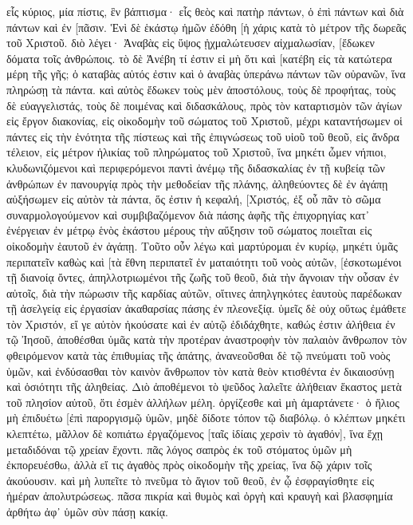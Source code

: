 εἷς κύριος, μία πίστις, ἓν βάπτισμα· 
εἷς θεὸς καὶ πατὴρ πάντων, ὁ ἐπὶ πάντων καὶ διὰ πάντων καὶ ἐν [πᾶσιν. 
Ἑνὶ δὲ ἑκάστῳ ἡμῶν ἐδόθη [ἡ χάρις κατὰ τὸ μέτρον τῆς δωρεᾶς τοῦ Χριστοῦ. 
διὸ λέγει· Ἀναβὰς εἰς ὕψος ᾐχμαλώτευσεν αἰχμαλωσίαν, [ἔδωκεν δόματα τοῖς ἀνθρώποις. 
τὸ δὲ Ἀνέβη τί ἐστιν εἰ μὴ ὅτι καὶ [κατέβη εἰς τὰ κατώτερα μέρη τῆς γῆς; 
ὁ καταβὰς αὐτός ἐστιν καὶ ὁ ἀναβὰς ὑπεράνω πάντων τῶν οὐρανῶν, ἵνα πληρώσῃ τὰ πάντα. 
καὶ αὐτὸς ἔδωκεν τοὺς μὲν ἀποστόλους, τοὺς δὲ προφήτας, τοὺς δὲ εὐαγγελιστάς, τοὺς δὲ ποιμένας καὶ διδασκάλους, 
πρὸς τὸν καταρτισμὸν τῶν ἁγίων εἰς ἔργον διακονίας, εἰς οἰκοδομὴν τοῦ σώματος τοῦ Χριστοῦ, 
μέχρι καταντήσωμεν οἱ πάντες εἰς τὴν ἑνότητα τῆς πίστεως καὶ τῆς ἐπιγνώσεως τοῦ υἱοῦ τοῦ θεοῦ, εἰς ἄνδρα τέλειον, εἰς μέτρον ἡλικίας τοῦ πληρώματος τοῦ Χριστοῦ, 
ἵνα μηκέτι ὦμεν νήπιοι, κλυδωνιζόμενοι καὶ περιφερόμενοι παντὶ ἀνέμῳ τῆς διδασκαλίας ἐν τῇ κυβείᾳ τῶν ἀνθρώπων ἐν πανουργίᾳ πρὸς τὴν μεθοδείαν τῆς πλάνης, 
ἀληθεύοντες δὲ ἐν ἀγάπῃ αὐξήσωμεν εἰς αὐτὸν τὰ πάντα, ὅς ἐστιν ἡ κεφαλή, [Χριστός, 
ἐξ οὗ πᾶν τὸ σῶμα συναρμολογούμενον καὶ συμβιβαζόμενον διὰ πάσης ἁφῆς τῆς ἐπιχορηγίας κατ᾽ ἐνέργειαν ἐν μέτρῳ ἑνὸς ἑκάστου μέρους τὴν αὔξησιν τοῦ σώματος ποιεῖται εἰς οἰκοδομὴν ἑαυτοῦ ἐν ἀγάπῃ. 
Τοῦτο οὖν λέγω καὶ μαρτύρομαι ἐν κυρίῳ, μηκέτι ὑμᾶς περιπατεῖν καθὼς καὶ [τὰ ἔθνη περιπατεῖ ἐν ματαιότητι τοῦ νοὸς αὐτῶν, 
[ἐσκοτωμένοι τῇ διανοίᾳ ὄντες, ἀπηλλοτριωμένοι τῆς ζωῆς τοῦ θεοῦ, διὰ τὴν ἄγνοιαν τὴν οὖσαν ἐν αὐτοῖς, διὰ τὴν πώρωσιν τῆς καρδίας αὐτῶν, 
οἵτινες ἀπηλγηκότες ἑαυτοὺς παρέδωκαν τῇ ἀσελγείᾳ εἰς ἐργασίαν ἀκαθαρσίας πάσης ἐν πλεονεξίᾳ. 
ὑμεῖς δὲ οὐχ οὕτως ἐμάθετε τὸν Χριστόν, 
εἴ γε αὐτὸν ἠκούσατε καὶ ἐν αὐτῷ ἐδιδάχθητε, καθώς ἐστιν ἀλήθεια ἐν τῷ Ἰησοῦ, 
ἀποθέσθαι ὑμᾶς κατὰ τὴν προτέραν ἀναστροφὴν τὸν παλαιὸν ἄνθρωπον τὸν φθειρόμενον κατὰ τὰς ἐπιθυμίας τῆς ἀπάτης, 
ἀνανεοῦσθαι δὲ τῷ πνεύματι τοῦ νοὸς ὑμῶν, 
καὶ ἐνδύσασθαι τὸν καινὸν ἄνθρωπον τὸν κατὰ θεὸν κτισθέντα ἐν δικαιοσύνῃ καὶ ὁσιότητι τῆς ἀληθείας. 
Διὸ ἀποθέμενοι τὸ ψεῦδος λαλεῖτε ἀλήθειαν ἕκαστος μετὰ τοῦ πλησίον αὐτοῦ, ὅτι ἐσμὲν ἀλλήλων μέλη. 
ὀργίζεσθε καὶ μὴ ἁμαρτάνετε· ὁ ἥλιος μὴ ἐπιδυέτω [ἐπὶ παροργισμῷ ὑμῶν, 
μηδὲ δίδοτε τόπον τῷ διαβόλῳ. 
ὁ κλέπτων μηκέτι κλεπτέτω, μᾶλλον δὲ κοπιάτω ἐργαζόμενος [ταῖς ἰδίαις χερσὶν τὸ ἀγαθόν], ἵνα ἔχῃ μεταδιδόναι τῷ χρείαν ἔχοντι. 
πᾶς λόγος σαπρὸς ἐκ τοῦ στόματος ὑμῶν μὴ ἐκπορευέσθω, ἀλλὰ εἴ τις ἀγαθὸς πρὸς οἰκοδομὴν τῆς χρείας, ἵνα δῷ χάριν τοῖς ἀκούουσιν. 
καὶ μὴ λυπεῖτε τὸ πνεῦμα τὸ ἅγιον τοῦ θεοῦ, ἐν ᾧ ἐσφραγίσθητε εἰς ἡμέραν ἀπολυτρώσεως. 
πᾶσα πικρία καὶ θυμὸς καὶ ὀργὴ καὶ κραυγὴ καὶ βλασφημία ἀρθήτω ἀφ᾽ ὑμῶν σὺν πάσῃ κακίᾳ. 
